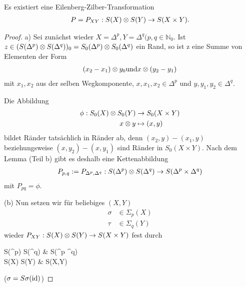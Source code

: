	\begin{proposition}
		Es existiert eine Eilenberg-Zilber-Transformation\begin{align*}
		P = P_{XY} : S(X) \otimes S(Y) \rightarrow S(X \times Y).
		\end{align*}
	\end{proposition}
\begin{proof}
	a) Sei zunächst wieder $X = \Delta^p, Y = \Delta^q (p, q \in \mathbb{N}_0$. Ist $z \in (S(\Delta^p) \otimes S(\Delta^q))_0 = S_0(\Delta^p) \otimes S_0(\Delta^q)$ ein Rand, so ist z eine Summe von Elementen der Form
	\begin{align*}
	(x_2 - x_1) \otimes y_0 \textrm{und} x \otimes (y_2 - y_1)
	\end{align*}
	mit $x_1, x_2$ aus der selben Wegkomponente, $x,x_1,x_2 \in \Delta^p$ und $y, y_1, y_2 \in \Delta^q$.
	
	Die Abbildung
	\begin{align*}
	\phi : S_0(X) \otimes S_0(Y) &\rightarrow S_0(X \times Y)\\
	x \otimes y &\mapsto (x,y)
		\end{align*}
		bildet Ränder tatsächlich in Ränder ab, denn $(x_2, y) - (x_1,y)$ beziehungsweise $(x,y_2) - (x,y_1)$ sind Ränder in $S_0(X \times Y)$. Nach dem Lemma (Teil b) gibt es deshalb eine Kettenabbildung
		\begin{align*}
		P_{p,q} := P_{\Delta^p, \Delta^q} : S(\Delta^p) \otimes S(\Delta^q) \rightarrow S(\Delta^p \times \Delta^q)
		\end{align*}
		mit $P_{pq} = \phi$.
		
		(b) Nun setzen wir für beliebiges $(X,Y)$
		\begin{align*}
		\sigma &\in \Sigma_p(X)\\
		\tau &\in \Sigma_q(Y)
		\end{align*}
		wieder $P_{XY} : S(X) \otimes S(Y) \rightarrow S(X \times Y)$ fest durch
		
		\begin{cd*}
			S(\Delta^p) \tensor S(\Delta^q) \ar[r, "P_{pq}"] 
			& S(\Delta^p \times \Delta^q) \\
			S(X) \tensor S(Y) \ar[r, "P_{XY}"]
			& S(X,Y)
		\end{cd*}
	($\sigma = S\sigma(\operatorname{id})$)
	

\end{proof}
